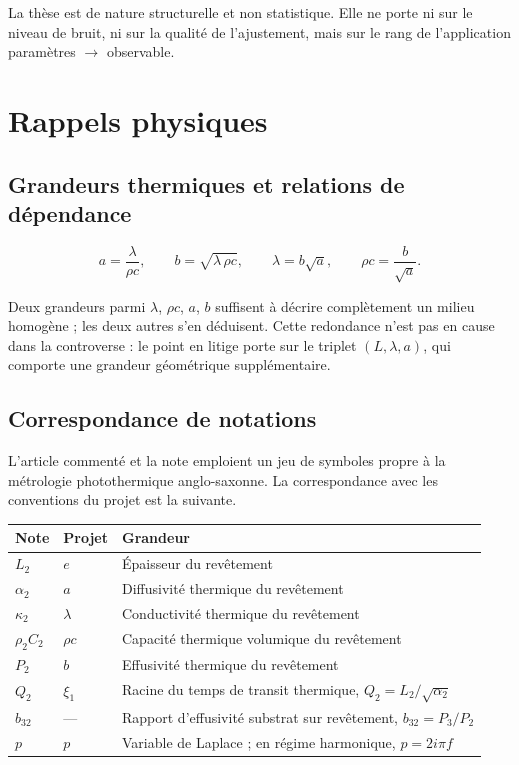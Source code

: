 \documentclass[11pt,a4paper]{article}
\begin{document}
La thèse est de nature structurelle et non statistique. Elle ne porte ni sur le niveau de bruit, ni sur
la qualité de l'ajustement, mais sur le rang de l'application paramètres $\rightarrow$ observable.

\section{Rappels physiques}

\subsection{Grandeurs thermiques et relations de dépendance}

\[ a = \frac{\lambda}{\rho c} , \qquad b = \sqrt{\lambda\,\rho c} , \qquad
\lambda = b\sqrt{a} , \qquad \rho c = \frac{b}{\sqrt{a}} . \]

Deux grandeurs parmi $\lambda$, $\rho c$, $a$, $b$ suffisent à décrire complètement un milieu homogène ;
les deux autres s'en déduisent. Cette redondance n'est pas en cause dans la controverse : le point en
litige porte sur le triplet $(L,\lambda,a)$, qui comporte une grandeur géométrique supplémentaire.

\subsection{Correspondance de notations}

L'article commenté et la note emploient un jeu de symboles propre à la métrologie photothermique
anglo-saxonne. La correspondance avec les conventions du projet est la suivante.

\begin{center}
\begin{tabularx}{\textwidth}{@{}llX@{}}
\toprule
\textbf{Note} & \textbf{Projet} & \textbf{Grandeur} \\
\midrule
$L_{2}$ & $e$ & Épaisseur du revêtement \\
$\alpha_{2}$ & $a$ & Diffusivité thermique du revêtement \\
$\kappa_{2}$ & $\lambda$ & Conductivité thermique du revêtement \\
$\rho_{2}C_{2}$ & $\rho c$ & Capacité thermique volumique du revêtement \\
$P_{2}$ & $b$ & Effusivité thermique du revêtement \\
$Q_{2}$ & $\xi_{1}$ & Racine du temps de transit thermique, $Q_{2}=L_{2}/\sqrt{\alpha_{2}}$ \\
$b_{32}$ & --- & Rapport d'effusivité substrat sur revêtement, $b_{32}=P_{3}/P_{2}$ \\
$p$ & $p$ & Variable de Laplace ; en régime harmonique, $p=2i\pi f$ \\
\bottomrule
\end{tabularx}
\end{center}
\end{document}
